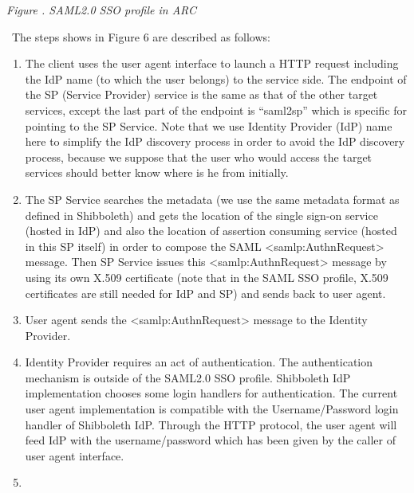 \documentclass{article}
\newcommand\liststyleLi{%
\renewcommand\theenumi{\arabic{enumi}}
\renewcommand\theenumii{\arabic{enumii}}
\renewcommand\theenumiii{\arabic{enumiii}}
\renewcommand\theenumiv{\arabic{enumiv}}
\renewcommand\labelenumi{\theenumi.}
\renewcommand\labelenumii{\theenumii.}
\renewcommand\labelenumiii{\theenumiii.}
\renewcommand\labelenumiv{\theenumiv.}
}
\newcounter{Figure}
\renewcommand\theFigure{\arabic{Figure}}
\begin{document}
\bigskip

{\centering{}\itshape\color{black}
Figure \stepcounter{Figure}{\theFigure}.\textbf{ }SAML2.0 SSO profile in
ARC
\par}

{\color{black}
\ The steps shows in Figure 6 are described as follows:}

\liststyleLi
\begin{enumerate}
\item {\color{black}
The client uses the user agent interface to launch a HTTP request
including the IdP name (to which the user belongs) to the service side.
The endpoint of the SP (Service Provider) service is the same as that
of the other target services, except the last part of the endpoint is
{\textquotedblleft}saml2sp{\textquotedblright} which is specific for
pointing to the SP Service. Note that we use Identity Provider (IdP)
name here to simplify the IdP discovery process in order to avoid the
IdP discovery process, because we suppose that the user who would
access the target services should better know where is he from
initially.}
\item {\color{black}
The SP Service searches the metadata (we use the same metadata format as
defined in Shibboleth) and gets the location of the single sign-on
service (hosted in IdP) and also the location of assertion consuming
service (hosted in this SP itself) in order to compose the SAML
{\textless}samlp:AuthnRequest{\textgreater} message. Then SP Service
issues this {\textless}samlp:AuthnRequest{\textgreater} message by
using its own X.509 certificate (note that in the SAML SSO profile,
X.509 certificates are still needed for IdP and SP) and sends back to
user agent.}
\item {\color{black}
User agent sends the {\textless}samlp:AuthnRequest{\textgreater} message
to the Identity Provider.}
\item {\color{black}
Identity Provider requires an act of authentication. The authentication
mechanism is outside of the SAML2.0 SSO profile. Shibboleth IdP
implementation chooses some login handlers for authentication. The
current user agent implementation is compatible with the
Username/Password login handler of Shibboleth IdP. Through the HTTP
protocol, the user agent will feed IdP with the username/password which
has been given by the caller of user agent interface.}
\item {\color{black}
}
\end{enumerate}
\end{document}
